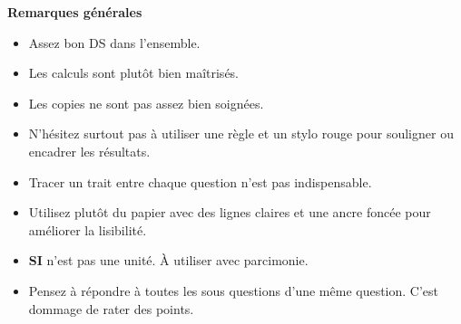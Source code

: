 \documentclass[10pt,fleqn]{article} %
\begin{document}

\pagestyle{fancy}
\thispagestyle{plain}


\def\columnseprulecolor{\color{ocre}}
\setlength{\columnseprule}{0.4pt} 



\vspace{6cm}
%
%
\textbf{Remarques générales}
\begin{itemize}
\item Assez bon DS dans l'ensemble. 
\item Les calculs sont plutôt bien maîtrisés. 
\item Les copies ne sont pas assez bien soignées. 
\item N'hésitez surtout pas à utiliser une règle et un stylo rouge pour souligner ou encadrer les résultats. 
\item Tracer un trait entre chaque question n'est pas indispensable. 
\item Utilisez plutôt du papier avec des lignes claires et une ancre foncée pour améliorer la lisibilité.
\item \textbf{SI} n'est pas une unité. À utiliser avec parcimonie.
\item Pensez à répondre à toutes les sous questions d'une même question. C'est dommage de rater des points. 
\end{itemize}
\end{document}
